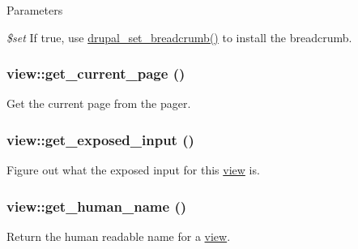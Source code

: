 \begin{DoxyParams}{Parameters}
\item[{\em \$set}]If true, use \hyperlink{common_8inc_a666113d06fa6ea461aff580e5c511eb0}{drupal\_\-set\_\-breadcrumb()} to install the breadcrumb. \end{DoxyParams}
\hypertarget{classview_a378b971894ed8b9c0ddaf36c8da52819}{
\subsubsection[{get\_\-current\_\-page}]{\setlength{\rightskip}{0pt plus 5cm}view::get\_\-current\_\-page ()}}
\label{classview_a378b971894ed8b9c0ddaf36c8da52819}
Get the current page from the pager. \hypertarget{classview_ac89e7aa08b258bc09d8e6209c6ebcfc2}{
\subsubsection[{get\_\-exposed\_\-input}]{\setlength{\rightskip}{0pt plus 5cm}view::get\_\-exposed\_\-input ()}}
\label{classview_ac89e7aa08b258bc09d8e6209c6ebcfc2}
Figure out what the exposed input for this \hyperlink{classview}{view} is. \hypertarget{classview_aaa81acca86f138d34887f142910ad0e4}{
\subsubsection[{get\_\-human\_\-name}]{\setlength{\rightskip}{0pt plus 5cm}view::get\_\-human\_\-name ()}}
\label{classview_aaa81acca86f138d34887f142910ad0e4}
Return the human readable name for a \hyperlink{classview}{view}.


